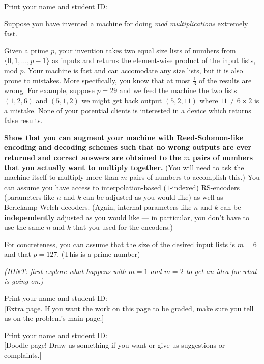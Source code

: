 \documentclass[11pt,fleqn]{article}
\newcommand{\fillin}[1]{\underline{\hskip #1}}
\newcommand{\startnewpage}{\newpage \noindent \vspace{0mm} {\sc Print} your name and student ID: \fillin{5in}\\[-0.2in]}
\begin{document}
\begin{qunlist}
\startnewpage


Suppose you have invented a machine for doing \emph{mod multiplications} 
extremely fast. 

Given a prime $p$, your invention takes two equal size lists of
numbers from $\{0,1,\ldots, p-1\}$ as inputs and returns the
element-wise product of the input lists, mod $p$. Your machine is fast
and can accomodate any size lists, but it is also prone to
mistakes. More specifically, you know that at most $\frac{1}{3}$ of
the results are wrong. For example, suppose $p=29$ and we feed the
machine the two lists $(1, 2, 6)$ and $(5, 1, 2)$ we might get back
output $(5, 2, 11)$ where $11 \neq 6 \times 2$ is a mistake. None of
your potential clients is interested in a device which returns false
results. 

{\bf Show that you can augment your machine with Reed-Solomon-like
encoding and decoding schemes such that no wrong outputs are ever
returned and correct answers are obtained to the $m$ pairs of numbers
that you actually want to multiply together.} (You will need to ask the
machine itself to multiply more than $m$ pairs of numbers to
accomplish this.) You can assume you have access to
interpolation-based ($1$-indexed) RS-encoders (parameters like $n$ and
$k$ can be adjusted as you would like) as well as Berlekamp-Welch
decoders. (Again, internal parameters like $n$ and $k$ can be
{\bf independently} adjusted as you would like --- in particular, you
don't have to use the same $n$ and $k$ that you used for the encoders.)

For concreteness, you can assume that the size of the desired input
lists is $m=6$ and that $p=127$. (This is a prime number)

{\em (HINT: first explore what happens with $m=1$ and $m=2$ to get an
  idea for what is going on.)}

\startnewpage

[Extra page. If you want the work on this page to be graded, make sure you tell us on the problem's main page.]


\startnewpage


[Doodle page! Draw us something if you want or give us suggestions or complaints.]


\end{qunlist}
\end{document}
